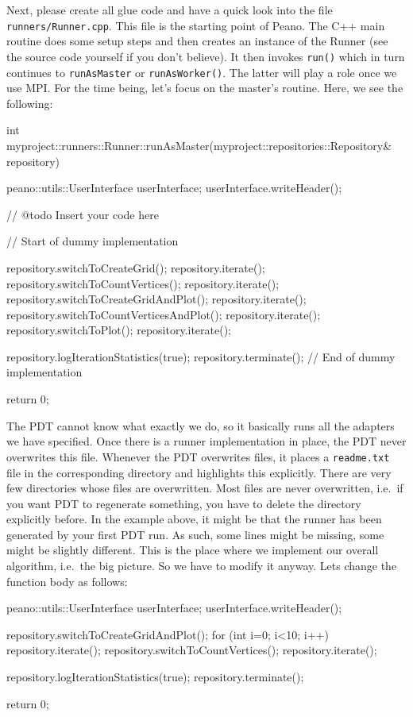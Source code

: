 \noindent
Next, please create all glue code and have a quick look into the file
\texttt{runners/Runner.cpp}.
This file is the starting point of Peano.
The C++ main routine does some setup steps and then creates an instance of the
Runner (see the source code yourself if you don't believe).
It then invokes \texttt{run()} which in turn continues to \texttt{runAsMaster}
or \texttt{runAsWorker()}.
The latter will play a role once we use MPI.
For the time being, let's focus on the master's routine.
Here, we see the following:

\begin{code}
int myproject::runners::Runner::runAsMaster(myproject::repositories::Repository& repository) {
  peano::utils::UserInterface userInterface;
  userInterface.writeHeader();

  // @todo Insert your code here
  
  // Start of dummy implementation
  
  repository.switchToCreateGrid(); repository.iterate();
  repository.switchToCountVertices(); repository.iterate();
  repository.switchToCreateGridAndPlot(); repository.iterate();
  repository.switchToCountVerticesAndPlot(); repository.iterate();
  repository.switchToPlot(); repository.iterate();
 
  repository.logIterationStatistics(true);
  repository.terminate();
  // End of dummy implementation

  return 0;
}
\end{code}

\noindent
The PDT cannot know what exactly we do, so it basically runs all the adapters we
have specified.
Once there is a runner implementation in place, the PDT never overwrites this
file.
Whenever the PDT overwrites files, it places a \texttt{readme.txt} file in the
corresponding directory and highlights this explicitly.
There are very few directories whose files are overwritten.
Most files are never overwritten, i.e.~if you want PDT to regenerate something,
you have to delete the directory explicitly before.
In the example above, it might be that the runner has been generated by your
first PDT run.
As such, some lines might be missing, some might be slightly different.
This is the place where we implement our overall algorithm,
i.e.~the big picture.
So we have to modify it anyway.
Lets change the function body as follows:

\begin{code}
  peano::utils::UserInterface userInterface;
  userInterface.writeHeader();

  repository.switchToCreateGridAndPlot();
  for (int i=0; i<10; i++) repository.iterate();
  repository.switchToCountVertices(); repository.iterate();

  repository.logIterationStatistics(true);
  repository.terminate();

  return 0;
\end{code}


